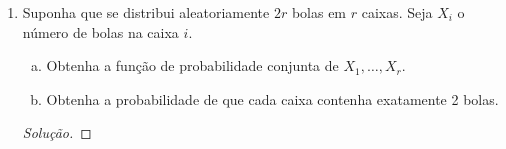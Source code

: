 \documentclass[../Notas.tex]{subfiles}
\begin{document}
\begin{enumerate}
    \begin{proof}[Solução]
        Temos dois casos
        \begin{enumerate}
            \item $k<M$: $P(Y=k) = P(X=k) = p(1-p)^{k-1}$ \\
            \item $k=M$: $P(Y=M) = P(X\geq M) = (1-p)^{M-1}$.
        \end{enumerate}
        Portanto,
        \[
        p_Y(k) = \begin{cases}
        p(1-p)^{k-1}, k\in\{2, \dots, M-1\} \\
        (1-p)^{M-1}, k=M \\
        0, \text{c.c.}
        \end{cases}
        \]
    \end{proof}
    \begin{enumerate}[a)]
    \item Determine a função de probabilidade conjunta de $X_1, \dots, X_6$.
    \item Determine as funções de probabilidade marginais de $X_i$, para $i=1,\dots,6$
    \item São $X_1, \dots, X_6$ independentes?
    \end{enumerate}
    \begin{proof}[Solução]
        \begin{enumerate}[a)]
            \item Temos $(X_1, X_2, \dots, X_6) \sim \text{Multinomial}(10,1/6,1/6,1/6,1/6,1/6,1/6)$.
            \item Temos $X_i\sim B(n, 1/6), \, i=1,2,\dots,6$.
            \item Não, porque 
            $p_{X_1, \dots, X_6}(x_1, \dots, x_6) \neq p_{X_1}(x_1)\cdots p_{X_6}(x_6)$ em geral.
        \end{enumerate}
    \end{proof}
    \item Suponha que se distribui aleatoriamente $2r$ bolas em $r$ caixas. Seja $X_i$ o número de bolas na caixa $i$.
    \begin{enumerate}[a)]
    \item Obtenha a função de probabilidade conjunta de $X_1, \dots, X_r$.
    \item Obtenha a probabilidade de que cada caixa contenha exatamente 2 bolas.
    \end{enumerate}
    \begin{proof}[Solução]

\end{proof}
\end{enumerate}
\end{document}
